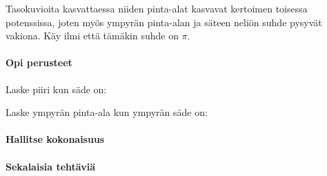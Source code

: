 

Tasokuvioita kasvattaessa niiden pinta-alat kasvavat kertoimen toisessa potenssissa, joten myös ympyrän pinta-alan ja säteen neliön suhde pysyvät vakiona. Käy ilmi että tämäkin suhde on $\pi$.


\begin{tehtavasivu}

\paragraph*{Opi perusteet}

\begin{tehtava}
Laske piiri kun säde on:
\begin{alakohdat}
\end{alakohdat}
\begin{vastaus}
\begin{alakohdat}
\end{alakohdat}
\end{vastaus}
\end{tehtava}

\begin{tehtava}
Laske ympyrän pinta-ala kun ympyrän säde on:
\begin{alakohdat}
\end{alakohdat}

\begin{vastaus}
\begin{alakohdat}
\end{alakohdat}
\end{vastaus}
\end{tehtava}


\paragraph*{Hallitse kokonaisuus}

\paragraph*{Sekalaisia tehtäviä}

\end{tehtavasivu}
